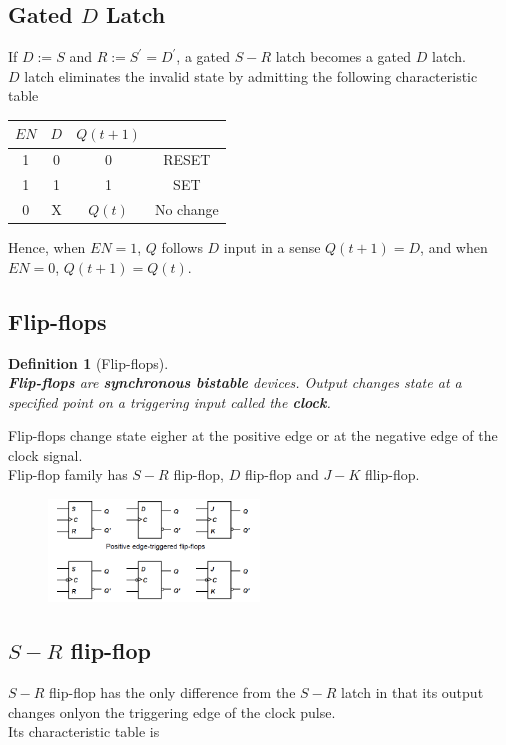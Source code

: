 \documentclass[12pt]{article}
\newtheorem{definition}{Definition}[section]
\theoremstyle{definition}
\begin{document}
\subsection{Gated $D$ Latch}
If $D:=S$ and $R:=S^\prime = D^\prime$, a gated $S-R$ latch becomes a gated $D$ latch.\\$D$ latch eliminates the invalid state by admitting the following characteristic table
\begin{table}[h]
\centering
\begin{tabular}{|c|c|c|c|}
\hline
$EN$&$D$&$Q(t+1)$&\\\hline
1&0&0&RESET\\\hline
1&1&1&SET\\\hline
0&X&$Q(t)$&No change\\\hline
\end{tabular}
\end{table}
Hence, when $EN = 1$, $Q$ follows $D$ input in a sense $Q(t+1) = D$, and when $EN = 0$, $Q(t+1) = Q(t)$.
\subsection{Flip-flops}
\begin{definition}[Flip-flops]
\hfill\\\normalfont \textbf{Flip-flops} are \textbf{synchronous bistable} devices. Output changes state at a specified point on a triggering input called the \textbf{clock}. 
\end{definition}
Flip-flops change state eigher at the positive edge or at the negative edge of the clock signal. \\
Flip-flop family has $S-R$ flip-flop, $D$ flip-flop and $J-K$ fllip-flop.
\begin{figure}[h]
\centering
\includegraphics[width = 0.5\textwidth]{8_3.png}
\end{figure} 
\subsection{$S-R$ flip-flop}
$S-R$ flip-flop has the only difference from the $S-R$ latch in that its output changes onlyon the triggering edge of the clock pulse.\\Its characteristic table is
\end{document}
